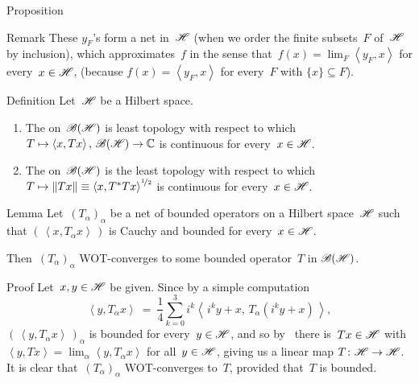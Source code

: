 \documentclass[a]{subfiles}
\begin{document}
\begin{parsec}
\begin{point}{Proposition}
\begin{point}{Remark}
These $y_F$'s form a net in~$\mathscr{H}$
(when we order the finite subsets~$F$ of~$\mathscr{H}$ by inclusion),
which approximates~$f$ in the
sense that~$f(x)=\lim_F \left<y_F,x\right>$
for every~$x\in \mathscr{H}$,
(because 
$f(x)=\left<y_F,x\right>$
for every~$F$
with $\{x\}\subseteq F$).
\end{point}
\end{point}
\begin{point}{Definition}%
Let~$\mathscr{H}$ be a Hilbert space.
\begin{enumerate}
\item
The 
on~$\mathscr{B}(\mathscr{H})$ is least topology
with respect to which $T\mapsto \left<x,Tx\right>,\,\mathscr{B}(\mathscr{H})\to\mathbb{C}$
is continuous for every~$x\in\mathscr{H}$.
\item
The 
on~$\mathscr{B}(\mathscr{H})$ is the least topology
with respect to which $T\mapsto \|Tx\|\equiv \smash{\left<x,T^*Tx\right>^{%
\nicefrac{1}{2}}}$
is continuous for every~$x\in\mathscr{H}$.
\end{enumerate}
\end{point}
\begin{point}{Lemma}%
Let~$(T_\alpha)_\alpha$ be a net of bounded operators
on a Hilbert space~$\mathscr{H}$
such that $(\,\left<x,T_\alpha x \right>\,)$ is
Cauchy and bounded for every~$x\in \mathscr{H}$.

Then~$(T_\alpha)_\alpha$
WOT-converges to some bounded operator~$T$ in $\mathscr{B}(\mathscr{H})$.
\begin{point}{Proof}%
Let~$x,y\in \mathscr{H}$ be given.
Since by a simple computation
\begin{equation*}
	\textstyle
	\left<y,T_\alpha x\right>
	\ = \ \frac{1}{4}\sum_{k=0}^3
	i^k\left<\,i^ky+x,\,T_\alpha (i^ky+x)\,\right>,
\end{equation*}
 $(\,\left<y,T_\alpha x\right>\,)_\alpha$
is bounded for every~$y\in \mathscr{H}$,
and so by~ there is~$Tx\in \mathscr{H}$ 
with $\left<y,Tx\right>=\lim_\alpha \left<y,T_\alpha x\right>$
for all~$y\in\mathscr{H}$,
giving us a linear map $T\colon \mathscr{H}\to \mathscr{H}$.
It is clear that~$(T_\alpha)_\alpha$
WOT-converges to~$T$,
provided that~$T$ is bounded.


\end{point}
\end{point}
\end{parsec}
\end{document}
